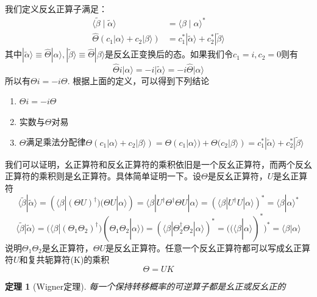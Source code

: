 \documentclass{article}
\numberwithin{equation}{subsection}
\newtheorem{theorem}{定理}
\begin{document}
我们定义反幺正算子满足：
\begin{equation}
    \begin{aligned}
        \langle\tilde{\beta} \mid \tilde{\alpha}\rangle &=\langle\beta \mid \alpha\rangle^{*} \\
        \hat{\Theta}\left(c_{1}|\alpha\rangle+c_{2}|\beta\rangle\right) &=c_{1}^{*}|\tilde{\alpha}\rangle+c_{2}^{*}|\tilde{\beta}\rangle
        \end{aligned}
\end{equation}
其中$|\tilde{\alpha}\rangle\equiv\hat{\Theta}|\alpha\rangle,|\tilde{\beta}\rangle \equiv \hat{\Theta}|\beta\rangle$是反幺正变换后的态。如果我们令$c_1=i,c_2=0$则有
\begin{equation}
    \hat{\Theta} i|\alpha\rangle=-i|\tilde{\alpha}\rangle=-i \hat{\Theta}|\alpha\rangle
\end{equation}
所以有$\Theta i=-i\Theta$. 根据上面的定义，可以得到下列结论
\begin{enumerate}
    \item $\Theta i=-i\Theta$
    \item 实数与$\Theta$对易
    \item $\Theta$满足乘法分配律$\Theta(c_1|\alpha\rangle+c_2|\beta\rangle)=\Theta(c_1|\alpha\rangle)+\Theta(c_2|\beta\rangle)=c_1^*|\tilde{\alpha}\rangle+c_2^*|\tilde{\beta}\rangle$
\end{enumerate}
我们可以证明，幺正算符和反幺正算符的乘积依旧是一个反幺正算符，而两个反幺正算符的乘积则是幺正算符。具体简单证明一下。设$\Theta$是反幺正算符，$U$是幺正算符
\begin{equation}
    \langle \tilde{\beta}|\tilde{\alpha}\rangle=(\langle\beta|(\Theta U)^\dagger)(\Theta U|\alpha\rangle)=\langle\beta|U^\dagger\Theta^\dagger\Theta U|\alpha\rangle=(\langle\beta|U^\dagger U|\alpha\rangle)^*=\langle\beta|\alpha\rangle^*
\end{equation}
\begin{equation}
\langle\tilde{\beta}|\tilde{\alpha}\rangle=(\langle\beta|(\Theta_1\Theta_2)^\dagger)(\Theta_1\Theta_2|\alpha\rangle)=(\langle\beta|\Theta_2^\dagger\Theta_2|\alpha\rangle)^*=((\langle\beta|\alpha\rangle)^*)^*=\langle\beta|\alpha\rangle
\end{equation}
说明$\Theta_1\Theta_2$是幺正算符，$\Theta U$是反幺正算符。任意一个反幺正算符都可以写成幺正算符$U$和复共轭算符(K)的乘积
\begin{equation}
    \Theta=UK
\end{equation}
\begin{theorem}[Wigner定理]
    每一个保持转移概率的可逆算子都是幺正或反幺正的
\end{theorem}
\end{document}
